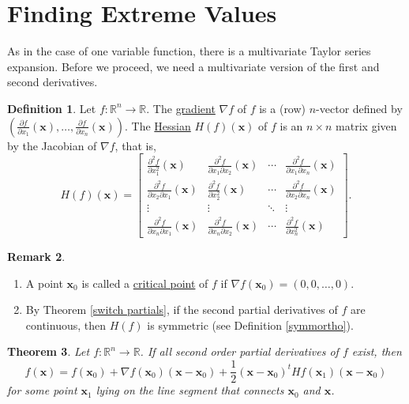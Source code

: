 \documentclass[12pt,letterpaper]{book}
\numberwithin{equation}{section}
\newtheorem{thm}{\textbf{Theorem}}[section]
\theoremstyle{definition}
\newtheorem{defi}[thm]{\textbf{Definition}}
\newtheorem{remark}[thm]{\textbf{Remark}}
\newcommand{\vx}{\bm{x}}
\begin{document}
\section{Finding Extreme Values}
As in the case of one variable function, there is a multivariate Taylor series expansion. Before we proceed, we need a multivariate version of the first and second derivatives.

\begin{defi}
Let $f:\mathbb{R}^n\to \mathbb{R}$. The \underline{gradient} $\nabla f$ of $f$ is a (row) $n$-vector defined by $(\frac{\partial f}{\partial x_1}(\bm{x}),\ldots,\frac{\partial f}{\partial x_n}(\bm{x}))$. The \underline{Hessian} $H(f)(\bm{x})$ of $f$ is an $n\times n$ matrix given by the Jacobian of $\nabla f$, that is,
$$H(f)(\bm{x})=\left[\begin{array}{cccc} \frac{\partial^2 f}{\partial x_1^2}(\bm{x}) & \frac{\partial^2 f}{\partial x_1 \partial x_2}(\bm{x}) & \cdots & \frac{\partial^2 f}{\partial x_1\partial x_n}(\bm{x}) \\ \frac{\partial^2 f}{\partial x_2\partial x_1}(\bm{x}) & \frac{\partial^2 f}{\partial x_2^2}(\bm{x}) & \cdots & \frac{\partial^2 f}{\partial x_2\partial x_n}(\bm{x}) \\ \vdots & \vdots & \ddots & \vdots \\  \frac{\partial^2 f}{\partial x_n\partial x_1}(\bm{x}) & \frac{\partial^2 f}{\partial x_n\partial x_2}(\bm{x}) & \cdots & \frac{\partial^2 f}{\partial x_n^2}(\bm{x}) \end{array}\right].$$
\end{defi}

\begin{remark}\quad
\begin{enumerate}
\item A point $\vx_0$ is called a \underline{critical point} of $f$ if $\nabla f(\vx_0)=(0,0,\ldots,0)$.
\item By Theorem \ref{switch partials}, if the second partial  derivatives of $f$ are continuous, then $H(f)$ is symmetric (see Definition \ref{symmortho}).
\end{enumerate}
\end{remark}

\begin{thm}\label{multi taylor}
Let $f:\mathbb{R}^n\to \mathbb{R}$. If all second order partial derivatives of $f$ exist, then
$$f(\vx)=f(\vx_0)+\nabla f(\vx_0)(\vx-\vx_0)+\frac{1}{2}(\vx-\vx_0)^t Hf(\vx_1)(\vx-\vx_0)$$
for some point $\vx_1$ lying on the line segment that connects $\vx_0$ and $\vx$.
\end{thm}
\end{document}
